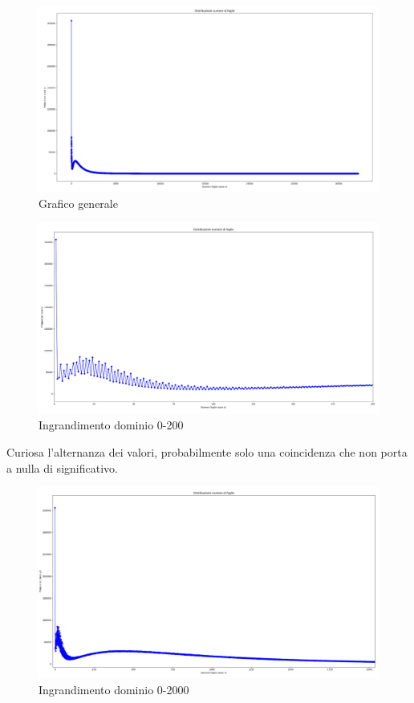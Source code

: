 \documentclass[a4paper,12pt]{report}
\begin{document}
\begin{figure}[h!]
    \centering
    \includegraphics[width=1\textwidth]{imgs/grafico_base.png} 
    \caption{Grafico generale}
    \label{fig:etichetta}
\end{figure}

\begin{figure}[h!]
    \centering
    \includegraphics[width=1\textwidth]{imgs/grafico_0_200.png} 
    \caption{Ingrandimento dominio 0-200}
    \label{fig:etichetta}
\end{figure}

Curiosa l'alternanza dei valori, probabilmente solo una coincidenza che non porta a nulla di significativo.

\begin{figure}[h!]
    \centering
    \includegraphics[width=1\textwidth]{imgs/grafico_0_2000.png} 
    \caption{Ingrandimento dominio 0-2000}
    \label{fig:etichetta}
\end{figure}
\end{document}
